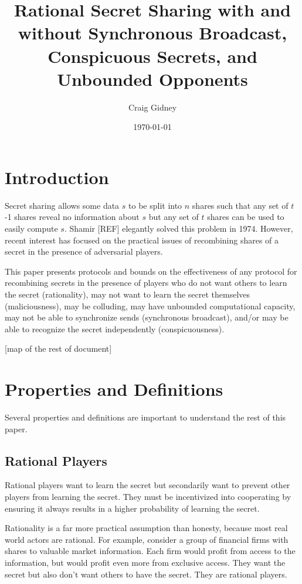 \documentclass{dalcsthesis}
\title{Rational Secret Sharing with and without Synchronous Broadcast, Conspicuous Secrets, and Unbounded Opponents}
\author{Craig Gidney}
\date{\today}
\begin{document}
\mcs
\maketitle

\chapter{Introduction}

Secret sharing allows some data $s$ to be split into $n$ shares such that any set of $t$-1 shares reveal no information about $s$ but any set of $t$ shares can be used to easily compute $s$. Shamir [REF] elegantly solved this problem in 1974. However, recent interest has focused on the practical issues of recombining shares of a secret in the presence of adversarial players.

This paper presents protocols and bounds on the effectiveness of any protocol for recombining secrets in the presence of players who do not want others to learn the secret (rationality), may not want to learn the secret themselves (maliciousness), may be colluding, may have unbounded computational capacity, may not be able to synchronize sends (synchronous broadcast), and/or may be able to recognize the secret independently (conspicuousness).

[map of the rest of document]

\chapter{Properties and Definitions}

Several properties and definitions are important to understand the rest of this paper.

\section{Rational Players}

Rational players want to learn the secret but secondarily want to prevent other players from learning the secret. They must be incentivized into cooperating by ensuring it always results in a higher probability of learning the secret.

Rationality is a far more practical assumption than honesty, because most real world actors are rational. For example, consider a group of financial firms with shares to valuable market information. Each firm would profit from access to the information, but would profit even more from exclusive access. They want the secret but also don't want others to have the secret. They are rational players.
\end{document}
